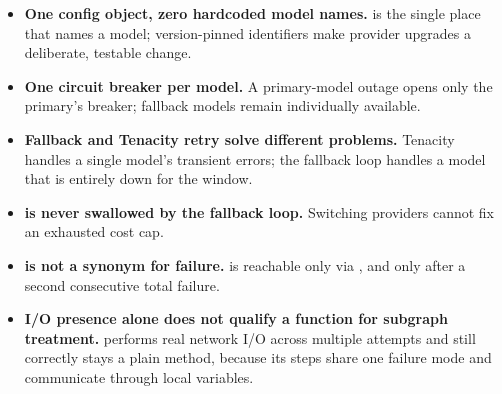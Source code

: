 \begin{takeawaybox}
\begin{itemize}
  \item \textbf{One config object, zero hardcoded model names.}
         is the single place that names a model;
        version-pinned identifiers make provider upgrades a deliberate,
        testable change.

  \item \textbf{One circuit breaker per model.}  A primary-model outage
        opens only the primary's breaker; fallback models remain
        individually available.

  \item \textbf{Fallback and Tenacity retry solve different problems.}
        Tenacity handles a single model's transient errors; the fallback
        loop handles a model that is entirely down for the window.

  \item \textbf{ is never swallowed by the
        fallback loop.}  Switching providers cannot fix an exhausted cost
        cap.

  \item \textbf{ is not a synonym for failure.}
         is reachable only via , and only
        after a second consecutive total failure.

  \item \textbf{I/O presence alone does not qualify a function for
        subgraph treatment.}   performs real
        network I/O across multiple attempts and still correctly stays a
        plain method, because its steps share one failure mode and
        communicate through local variables.
\end{itemize}
\end{takeawaybox}
